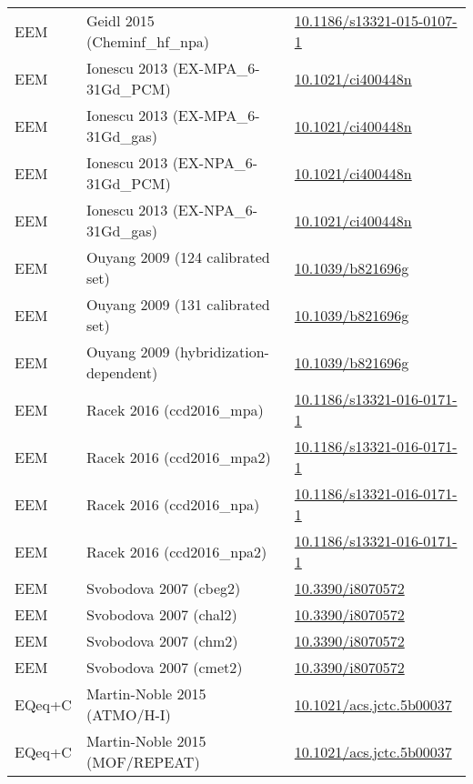 \documentclass[oneside]{memoir}
\begin{document}
\begin{table}
\begin{tabular}{lll}
EEM & Geidl 2015 (Cheminf\_hf\_npa) & \href{https://doi.org/10.1186/s13321-015-0107-1}{10.1186/s13321-015-0107-1}\\
EEM & Ionescu 2013 (EX-MPA\_6-31Gd\_PCM) & \href{https://doi.org/10.1021/ci400448n}{10.1021/ci400448n}\\
EEM & Ionescu 2013 (EX-MPA\_6-31Gd\_gas) & \href{https://doi.org/10.1021/ci400448n}{10.1021/ci400448n}\\
EEM & Ionescu 2013 (EX-NPA\_6-31Gd\_PCM) & \href{https://doi.org/10.1021/ci400448n}{10.1021/ci400448n}\\
EEM & Ionescu 2013 (EX-NPA\_6-31Gd\_gas) & \href{https://doi.org/10.1021/ci400448n}{10.1021/ci400448n}\\
EEM & Ouyang 2009 (124 calibrated set) & \href{https://doi.org/10.1039/b821696g}{10.1039/b821696g}\\
EEM & Ouyang 2009 (131 calibrated set) & \href{https://doi.org/10.1039/b821696g}{10.1039/b821696g}\\
EEM & Ouyang 2009 (hybridization-dependent) & \href{https://doi.org/10.1039/b821696g}{10.1039/b821696g}\\
EEM & Racek 2016 (ccd2016\_mpa) & \href{https://doi.org/10.1186/s13321-016-0171-1}{10.1186/s13321-016-0171-1}\\
EEM & Racek 2016 (ccd2016\_mpa2) & \href{https://doi.org/10.1186/s13321-016-0171-1}{10.1186/s13321-016-0171-1}\\
EEM & Racek 2016 (ccd2016\_npa) & \href{https://doi.org/10.1186/s13321-016-0171-1}{10.1186/s13321-016-0171-1}\\
EEM & Racek 2016 (ccd2016\_npa2) & \href{https://doi.org/10.1186/s13321-016-0171-1}{10.1186/s13321-016-0171-1}\\
EEM & Svobodova 2007 (cbeg2) & \href{https://doi.org/10.3390/i8070572}{10.3390/i8070572}\\
EEM & Svobodova 2007 (chal2) & \href{https://doi.org/10.3390/i8070572}{10.3390/i8070572}\\
EEM & Svobodova 2007 (chm2) & \href{https://doi.org/10.3390/i8070572}{10.3390/i8070572}\\
EEM & Svobodova 2007 (cmet2) & \href{https://doi.org/10.3390/i8070572}{10.3390/i8070572}\\
EQeq+C & Martin-Noble 2015 (ATMO/H-I) & \href{https://doi.org/10.1021/acs.jctc.5b00037}{10.1021/acs.jctc.5b00037}\\
EQeq+C & Martin-Noble 2015 (MOF/REPEAT) & \href{https://doi.org/10.1021/acs.jctc.5b00037}{10.1021/acs.jctc.5b00037}\\

\end{tabular}
\end{table}
\end{document}
